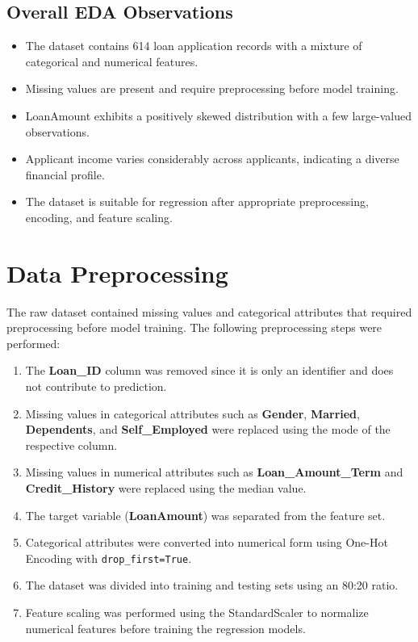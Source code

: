 \documentclass{article}
\begin{document}
\subsection{Overall EDA Observations} 
\begin{itemize} 
    \item The dataset contains 614 loan application records with a mixture of categorical and numerical features. 
    \item Missing values are present and require preprocessing before model training. 
    \item LoanAmount exhibits a positively skewed distribution with a few large-valued observations. 
    \item Applicant income varies considerably across applicants, indicating a diverse financial profile. 
    \item The dataset is suitable for regression after appropriate preprocessing, encoding, and feature scaling. 
\end{itemize}
\section{Data Preprocessing}

The raw dataset contained missing values and categorical attributes that required preprocessing before model training. The following preprocessing steps were performed:

\begin{enumerate}
    \item The \textbf{Loan\_ID} column was removed since it is only an identifier and does not contribute to prediction.
    
    \item Missing values in categorical attributes such as \textbf{Gender}, \textbf{Married}, \textbf{Dependents}, and \textbf{Self\_Employed} were replaced using the mode of the respective column.
    
    \item Missing values in numerical attributes such as \textbf{Loan\_Amount\_Term} and \textbf{Credit\_History} were replaced using the median value.
    
    \item The target variable (\textbf{LoanAmount}) was separated from the feature set.
    
    \item Categorical attributes were converted into numerical form using One-Hot Encoding with \texttt{drop\_first=True}.
    
    \item The dataset was divided into training and testing sets using an 80:20 ratio.
    
    \item Feature scaling was performed using the StandardScaler to normalize numerical features before training the regression models.
\end{enumerate}
\end{document}
